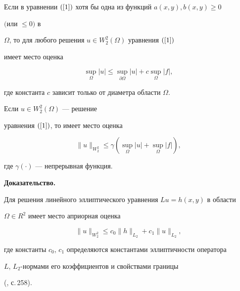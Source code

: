 \begin{lem}


\label{l2}


Если в уравнении $(\ref{1})$ хотя бы одна из функций $a(x,y), b(x,y)\ge 0$ 


$($или $\le 0)$ в


$\Omega$, то для любого решения $u\in W^2_2(\Omega)$ уравнения $(\ref{1})$


имеет место оценка


$$


\sup_{\Omega } |u|\le \sup_{\partial \Omega }|u|+c\sup_{\Omega }|f|,


$$


где константа $c$ зависит только от диаметра области $\Omega $.


\end{lem}





\begin{lem}


\label{l3}


Если $u\in W^2_2(\Omega)$ --- решение


уравнения $(\ref{1})$, то имеет место оценка


$$


\|u\|_{W^2_2} \le \gamma(\sup_{\Omega }|u|+\sup_{\Omega }|f|),


$$


где $\gamma(\cdot)$ --- непрерывная функция.


\end{lem}





{\bf Доказательство.}


Для решения линейного эллиптического уравнения $Lu=h(x,y)$ в области


$\Omega \in R^2$ имеет место априорная оценка


\begin{equation}\label{lin}


\|u\|_{W^2_2}\le c_0\|h\|_{L_2}+c_1\|u\|_{L_2},


\end{equation}


где константы $c_0$, $c_1$ определяются константами эллиптичности оператора


$L$, $L_2$-нормами его коэффициентов и свойствами границы


(\cite{lad}, с.\,258).





